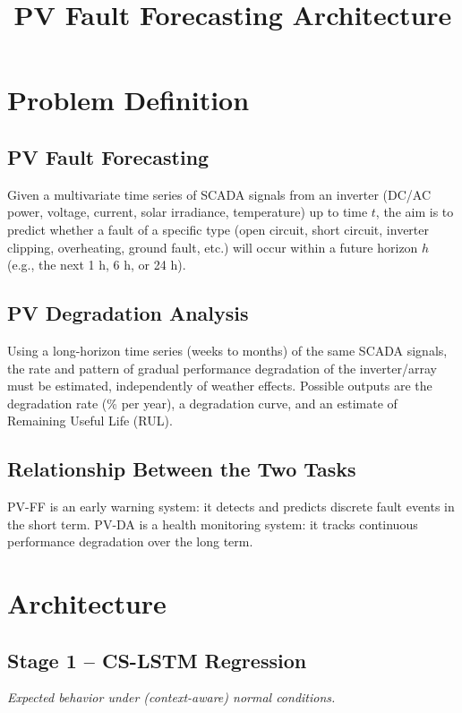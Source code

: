\documentclass[11pt,a4paper]{article}
\title{PV Fault Forecasting Architecture}
\author{}
\date{}
\begin{document}
\maketitle

\section{Problem Definition}

\subsection*{PV Fault Forecasting}
Given a multivariate time series of SCADA signals from an inverter (DC/AC power, voltage, current, solar irradiance, temperature) up to time $t$, the aim is to predict whether a fault of a specific type (open circuit, short circuit, inverter clipping, overheating, ground fault, etc.) will occur within a future horizon $h$ (e.g., the next 1 h, 6 h, or 24 h).

\subsection*{PV Degradation Analysis}
Using a long-horizon time series (weeks to months) of the same SCADA signals, the rate and pattern of gradual performance degradation of the inverter/array must be estimated, independently of weather effects. Possible outputs are the degradation rate (\% per year), a degradation curve, and an estimate of Remaining Useful Life (RUL).

\subsection*{Relationship Between the Two Tasks}
PV-FF is an early warning system: it detects and predicts discrete fault events in the short term. PV-DA is a health monitoring system: it tracks continuous performance degradation over the long term.

\section{Architecture}

\subsection*{Stage 1 -- CS-LSTM Regression}
\emph{Expected behavior under (context-aware) normal conditions.}
\end{document}
